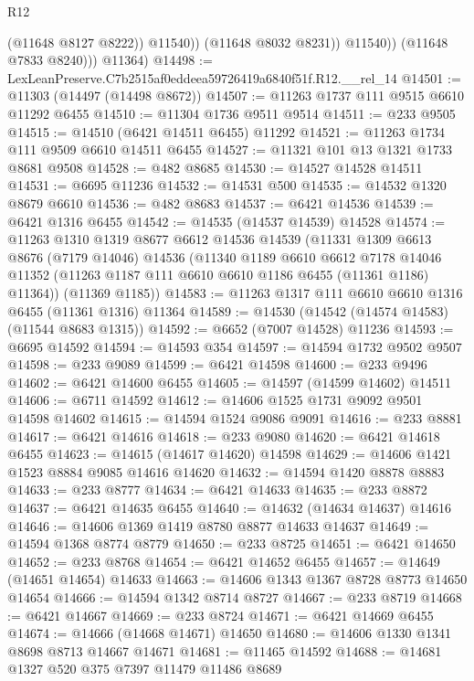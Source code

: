\begin{lexlean}{R12}
\begin{coremodule}
                      (@11648 @8127 @8222))
                    @11540))
                (@11648 @8032 @8231))
              @11540))
          (@11648 @7833 @8240)))
      @11364)
@14498 := LexLeanPreserve.C7b2515af0eddeea59726419a6840f51f.R12.__rel_14
@14501 := @11303 (@14497 (@14498 @8672))
@14507 := @11263 @1737 @111 @9515 @6610 @11292 @6455
@14510 := @11304 @1736 @9511 @9514
@14511 := @233 @9505
@14515 := @14510 (@6421 @14511 @6455) @11292
@14521 := @11263 @1734 @111 @9509 @6610 @14511 @6455
@14527 := @11321 @101 @13 @1321 @1733 @8681 @9508
@14528 := @482 @8685
@14530 := @14527 @14528 @14511
@14531 := @6695 @11236
@14532 := @14531 @500
@14535 := @14532 @1320 @8679 @6610
@14536 := @482 @8683
@14537 := @6421 @14536
@14539 := @6421 @1316 @6455
@14542 := @14535 (@14537 @14539) @14528
@14574 := @11263
    @1310
    @1319
    @8677
    @6612
    @14536
    @14539
    (@11331
      @1309
      @6613
      @8676
      (@7179 @14046)
      @14536
      (@11340
        @1189
        @6610
        @6612
        @7178
        @14046
        @11352
        (@11263 @1187 @111 @6610 @6610 @1186 @6455 (@11361 @1186) @11364))
      (@11369 @1185))
@14583 := @11263 @1317 @111 @6610 @6610 @1316 @6455 (@11361 @1316) @11364
@14589 := @14530 (@14542 (@14574 @14583) (@11544 @8683 @1315))
@14592 := @6652 (@7007 @14528) @11236
@14593 := @6695 @14592
@14594 := @14593 @354
@14597 := @14594 @1732 @9502 @9507
@14598 := @233 @9089
@14599 := @6421 @14598
@14600 := @233 @9496
@14602 := @6421 @14600 @6455
@14605 := @14597 (@14599 @14602) @14511
@14606 := @6711 @14592
@14612 := @14606 @1525 @1731 @9092 @9501 @14598 @14602
@14615 := @14594 @1524 @9086 @9091
@14616 := @233 @8881
@14617 := @6421 @14616
@14618 := @233 @9080
@14620 := @6421 @14618 @6455
@14623 := @14615 (@14617 @14620) @14598
@14629 := @14606 @1421 @1523 @8884 @9085 @14616 @14620
@14632 := @14594 @1420 @8878 @8883
@14633 := @233 @8777
@14634 := @6421 @14633
@14635 := @233 @8872
@14637 := @6421 @14635 @6455
@14640 := @14632 (@14634 @14637) @14616
@14646 := @14606 @1369 @1419 @8780 @8877 @14633 @14637
@14649 := @14594 @1368 @8774 @8779
@14650 := @233 @8725
@14651 := @6421 @14650
@14652 := @233 @8768
@14654 := @6421 @14652 @6455
@14657 := @14649 (@14651 @14654) @14633
@14663 := @14606 @1343 @1367 @8728 @8773 @14650 @14654
@14666 := @14594 @1342 @8714 @8727
@14667 := @233 @8719
@14668 := @6421 @14667
@14669 := @233 @8724
@14671 := @6421 @14669 @6455
@14674 := @14666 (@14668 @14671) @14650
@14680 := @14606 @1330 @1341 @8698 @8713 @14667 @14671
@14681 := @11465 @14592
@14688 := @14681 @1327 @520 @375 @7397 @11479 @11486 @8689

\end{coremodule}
\end{lexlean}
